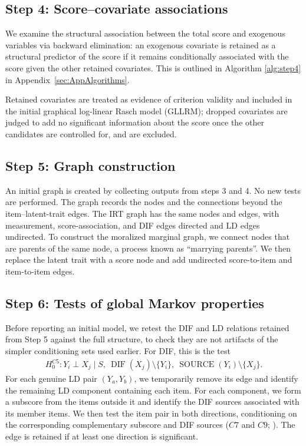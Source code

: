 \documentclass[12pt]{article}
\theoremstyle{examplestyle}
\begin{document}
\subsection{Step 4: Score--covariate associations}
We examine the structural association between the total score and exogenous variables via backward elimination: an exogenous covariate is retained as a structural predictor of the score if it remains conditionally associated with the score given the other retained covariates. This is outlined in Algorithm \ref{alg:step4} in Appendix~\ref{sec:AppAlgorithms}.

Retained covariates are treated as evidence of criterion validity and included in the initial graphical log-linear Rasch model (GLLRM); dropped covariates are judged to add no significant information about the score once the other candidates are controlled for, and are excluded.

\subsection{Step 5: Graph construction}

An initial graph is created by collecting outputs from steps 3 and 4. No new tests are performed. The graph records the nodes and the connections beyond the item--latent-trait edges. The IRT graph has the same nodes and edges, with measurement, score-association, and DIF edges directed and LD edges undirected. To construct the moralized marginal graph, we connect nodes that are parents of the same node, a process known as ``marrying parents''. We then replace the latent trait with a score node and add undirected score-to-item and item-to-item edges.


\subsection{Step 6: Tests of global Markov properties}
Before reporting an initial model, we retest the DIF and LD relations retained from Step 5 against the full structure, to check they are not artifacts of the simpler conditioning sets used earlier. For DIF, this is the test
\begin{align}
H_0^{C5}: Y_i \perp X_j
\mid
S,\ \operatorname{DIF}(X_j)\setminus\{Y_i\},\
\operatorname{SOURCE}(Y_i)\setminus\{X_j\}. \label{C5}
\end{align}
For each genuine LD pair $(Y_a,Y_b)$, we temporarily remove its edge and identify the remaining LD component containing each item. For each component, we form a subscore from the items outside it and identify the DIF sources associated with its member items. We then test the item pair in both directions, conditioning on the corresponding complementary subscore and DIF sources ($C7$ and $C9$; \citealp{kreiner-christensen-2011}). The edge is retained if at least one direction is significant.
\end{document}
